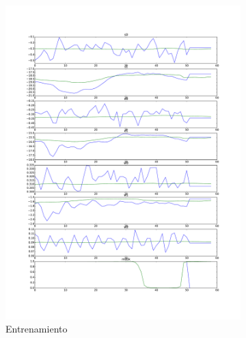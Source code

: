 \begin{figure}
	\begin{subfigure}{0.3\textwidth}
		\centering
		\includegraphics[width=\linewidth]{imagenes/resultados/pred_train.pdf}
		\caption{Entrenamiento}
		\label{fig:resultados/pred_train}
	\end{subfigure}
	\begin{subfigure}{0.3\textwidth}
		\centering

\end{subfigure}
\end{figure}
